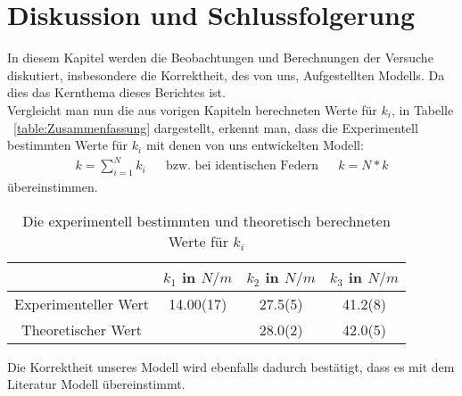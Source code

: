 \chapter{Diskussion und Schlussfolgerung}
\label{chap:schlussfolgerung}

In diesem Kapitel werden die Beobachtungen und Berechnungen der Versuche diskutiert, insbesondere  die Korrektheit, des von uns, Aufgestellten Modells. Da dies das Kernthema dieses Berichtes ist.\\
Vergleicht man nun  die aus vorigen Kapiteln berechneten Werte für $k_i$, in Tabelle ~\autoref{table:Zusammenfassung} dargestellt, erkennt man, dass die Experimentell bestimmten Werte für $k_i$ mit denen von uns entwickelten Modell:
\begin{align}
	k=\sum_{i=1}^{N} k_i &&\text{bzw. bei identischen Federn} && k=N*k
\end{align} 
übereinstimmen.\\
\begin{table}[htbp]
	\centering
	\caption{\label{table:Zusammenfassung}Die experimentell bestimmten und theoretisch berechneten Werte für $k_i$}
	\begin{tabular}[h]{cccc}
		\hline
		& $k_1$ in $N/m$ & $k_2$ in $N/m$ & $k_3$ in $N/m$\\
		\hline
		Experimenteller Wert & 14.00(17) &  27.5(5)  & 41.2(8)\\
		Theoretischer Wert & & 28.0(2) & 42.0(5)\\
		\hline
	\end{tabular}
\end{table}
Die Korrektheit unseres Modell wird ebenfalls dadurch bestätigt, dass es mit dem Literatur Modell übereinstimmt.
